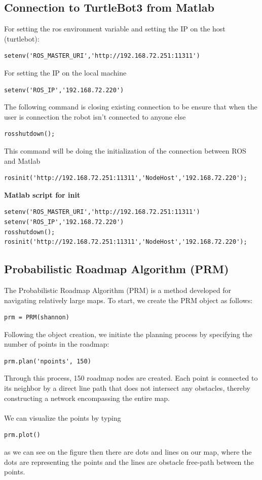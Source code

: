 \documentclass[12pt,a4paper]{article}
\begin{document}
	\subsection{Connection to TurtleBot3 from Matlab}
	For setting the ros environment variable and setting the IP on the host (turtlebot):
	\begin{lstlisting}[style=Matlab-editor]
setenv('ROS_MASTER_URI','http://192.168.72.251:11311')\end{lstlisting}
	For setting the IP on the local machine 
	\begin{lstlisting}
setenv('ROS_IP','192.168.72.220')\end{lstlisting}
	The following command is closing existing connection to be ensure that when the user is connection the robot isn't connected to anyone else
	\begin{lstlisting}[style=Matlab-editor]
rosshutdown();\end{lstlisting}
	This command will be doing the initialization of the connection between ROS and Matlab
	\begin{lstlisting}[style=Matlab-editor]
rosinit('http://192.168.72.251:11311','NodeHost','192.168.72.220');\end{lstlisting} 
	\vspace{1cm}
	\noindent\textbf{Matlab script for init}
	\begin{lstlisting}[style=Matlab-editor]
setenv('ROS_MASTER_URI','http://192.168.72.251:11311')
setenv('ROS_IP','192.168.72.220')
rosshutdown();
rosinit('http://192.168.72.251:11311','NodeHost','192.168.72.220');\end{lstlisting}
	\clearpage
	\subsection{Probabilistic Roadmap Algorithm (PRM)}
	The Probabilistic Roadmap Algorithm (PRM) is a method developed for navigating relatively large maps. To start, we create the PRM object as follows:
	\begin{lstlisting}[style=Matlab-editor]
		prm = PRM(shannon)
	\end{lstlisting}
	Following the object creation, we initiate the planning process by specifying the number of points in the roadmap:
	\begin{lstlisting}[style=Matlab-editor]
		prm.plan('npoints', 150)
	\end{lstlisting}
	Through this process, 150 roadmap nodes are created. Each point is connected to its neighbor by a direct line path that does not intersect any obstacles, thereby constructing a network encompassing the entire map.
	\\\\
	We can visualize the points by typing
	\begin{lstlisting}
prm.plot()\end{lstlisting} 
	as we can see on the figure then there are dots and lines on our map, where the dots are representing the points and the lines are obstacle free-path between the points.
\end{document}
